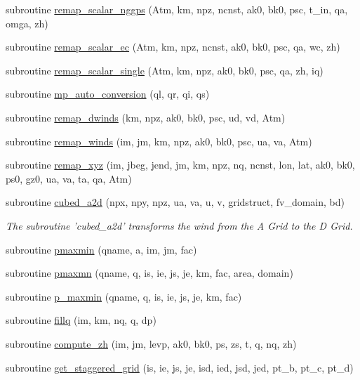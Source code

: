 \begin{DoxyCompactItemize}
\item 
subroutine \hyperlink{classexternal__ic__mod_a81ec4cdb567eb4969a9b08b59883b791}{remap\-\_\-scalar\-\_\-nggps} (Atm, km, npz, ncnst, ak0, bk0, psc, t\-\_\-in, qa, omga, zh)
\item 
subroutine \hyperlink{classexternal__ic__mod_a2a128c3f4469123904446b5705140778}{remap\-\_\-scalar\-\_\-ec} (Atm, km, npz, ncnst, ak0, bk0, psc, qa, wc, zh)
\item 
subroutine \hyperlink{classexternal__ic__mod_a54fd6eeb85735101f589d85bd3df8c9e}{remap\-\_\-scalar\-\_\-single} (Atm, km, npz, ak0, bk0, psc, qa, zh, iq)
\item 
subroutine \hyperlink{classexternal__ic__mod_a09fea20a4b6f517c9f5ffb1adc6939f2}{mp\-\_\-auto\-\_\-conversion} (ql, qr, qi, qs)
\item 
subroutine \hyperlink{classexternal__ic__mod_a252f92d8428ebd9e0692b065abca0181}{remap\-\_\-dwinds} (km, npz, ak0, bk0, psc, ud, vd, Atm)
\item 
subroutine \hyperlink{classexternal__ic__mod_a8f2da4b4a3757435e0e62136ccdd8139}{remap\-\_\-winds} (im, jm, km, npz, ak0, bk0, psc, ua, va, Atm)
\item 
subroutine \hyperlink{classexternal__ic__mod_a3f5edb2d7d54ed528d9536f81b55af69}{remap\-\_\-xyz} (im, jbeg, jend, jm, km, npz, nq, ncnst, lon, lat, ak0, bk0, ps0, gz0, ua, va, ta, qa, Atm)
\item 
subroutine \hyperlink{classexternal__ic__mod_ad063f728624f5080b2aa9a90b8bf2c4c}{cubed\-\_\-a2d} (npx, npy, npz, ua, va, u, v, gridstruct, fv\-\_\-domain, bd)
\begin{DoxyCompactList}\small\item\em The subroutine 'cubed\-\_\-a2d' transforms the wind from the A Grid to the D Grid. \end{DoxyCompactList}\item 
subroutine \hyperlink{classexternal__ic__mod_aeb8db7e1db87d982349afc18c0ea3a84}{pmaxmin} (qname, a, im, jm, fac)
\item 
subroutine \hyperlink{classexternal__ic__mod_a9ff7391894a908536c199acb6be9af35}{pmaxmn} (qname, q, is, ie, js, je, km, fac, area, domain)
\item 
subroutine \hyperlink{classexternal__ic__mod_aed974417c71160c8698d13a025561537}{p\-\_\-maxmin} (qname, q, is, ie, js, je, km, fac)
\item 
subroutine \hyperlink{classexternal__ic__mod_a44111251c4b15808e291189bd902e385}{fillq} (im, km, nq, q, dp)
\item 
subroutine \hyperlink{classexternal__ic__mod_a66a468c142f85fab8b17cbbba40f6d71}{compute\-\_\-zh} (im, jm, levp, ak0, bk0, ps, zs, t, q, nq, zh)
\item 
subroutine \hyperlink{classexternal__ic__mod_aba03b236b50672b51dcf0f37613f3afe}{get\-\_\-staggered\-\_\-grid} (is, ie, js, je, isd, ied, jsd, jed, pt\-\_\-b, pt\-\_\-c, pt\-\_\-d)
\end{DoxyCompactItemize}
